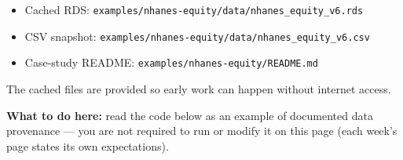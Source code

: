 \documentclass[
  letterpaper,
  DIV=11,
  numbers=noendperiod,
  oneside]{scrreprt}
\providecommand{\tightlist}{%
  \setlength{\itemsep}{0pt}\setlength{\parskip}{0pt}}
\begin{document}
\begin{itemize}
\tightlist
\item
  Cached RDS:
  \texttt{examples/nhanes-equity/data/nhanes\_equity\_v6.rds}
\item
  CSV snapshot:
  \texttt{examples/nhanes-equity/data/nhanes\_equity\_v6.csv}
\item
  Case-study README: \texttt{examples/nhanes-equity/README.md}
\end{itemize}

The cached files are provided so early work can happen without internet
access.

\textbf{What to do here:} read the code below as an example of
documented data provenance --- you are not required to run or modify it
on this page (each week's page states its own expectations).
\end{document}
